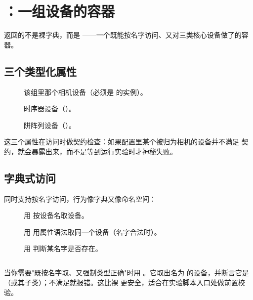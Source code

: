 \documentclass[11pt,oneside,openany]{book}
\begin{document}
\section{：一组设备的容器}

 返回的不是裸字典，而是 ——一个既能按名字访问、又对三类核心设备做了的容器。

\subsection{三个类型化属性}

\begin{description}
\item[] 该组里那个相机设备（必须是  的实例）。
\item[] 时序器设备（）。
\item[] 阱阵列设备（）。
\end{description}

这三个属性在访问时做契约检查：如果配置里某个被归为相机的设备并不满足  契约，就会暴露出来，而不是等到运行实验时才神秘失败。

\subsection{字典式访问}

 同时支持按名字访问，行为像字典又像命名空间：

\begin{description}
\item[] 用  按设备名取设备。
\item[] 用  用属性语法取同一个设备（名字合法时）。
\item[] 用  判断某名字是否存在。
\end{description}

\subsection{}

当你需要"既按名字取、又强制类型正确"时用 。它取出名为  的设备，并断言它是 （或其子类）；不满足就报错。这比裸  更安全，适合在实验脚本入口处做前置校验。
\end{document}
